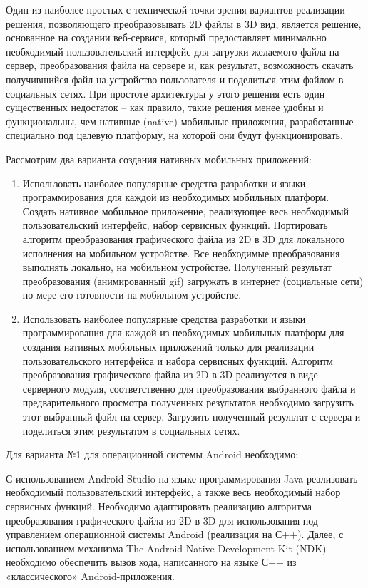 Один из наиболее простых с технической точки зрения вариантов реализации решения, позволяющего преобразовывать 2D файлы в 3D вид, является решение, основанное на создании веб-сервиса, который предоставляет минимально необходимый пользовательский интерфейс для загрузки желаемого файла на сервер, преобразования файла на сервере и, как результат, возможность скачать получившийся файл на устройство пользователя и поделиться этим файлом в социальных сетях. При простоте архитектуры у этого решения есть один существенных недостаток – как правило, такие решения менее удобны и функциональны, чем нативные (native) мобильные приложения, разработанные специально под целевую платформу, на которой они будут функционировать.

Рассмотрим два варианта создания нативных мобильных приложений:

\begin{enumerate}
	\item Использовать наиболее популярные средства разработки и языки программирования для каждой из необходимых мобильных платформ. Создать нативное мобильное приложение, реализующее весь необходимый пользовательский интерфейс, набор сервисных функций. Портировать алгоритм преобразования графического файла из 2D в 3D для локального исполнения на мобильном устройстве. Все необходимые преобразования выполнять локально, на мобильном устройстве. Полученный результат преобразования (анимированный gif) загружать в интернет (социальные сети) по мере его готовности на мобильном устройстве.
	
	\item Использовать наиболее популярные средства разработки и языки программирования для каждой из необходимых мобильных платформ для создания нативных мобильных приложений только для реализации пользовательского интерфейса и набора сервисных функций. Алгоритм преобразования графического файла из 2D в 3D реализуется в виде серверного модуля, соответственно для преобразования выбранного файла и предварительного просмотра полученных результатов необходимо загрузить этот выбранный файл на сервер. Загрузить полученный результат с сервера и поделиться этим результатом в социальных сетях.
\end{enumerate}

Для варианта №1 для операционной системы Android необходимо:

С использованием Android Studio на языке программирования Java реализовать необходимый пользовательский интерфейс, а также весь необходимый набор сервисных функций. Необходимо адаптировать реализацию алгоритма преобразования графического файла из 2D в 3D для использования под управлением операционной системы Android (реализация на С++). Далее, с использованием механизма The Android Native Development Kit (NDK) необходимо обеспечить вызов кода, написанного на языке С++ из «классического» Android-приложения. 

